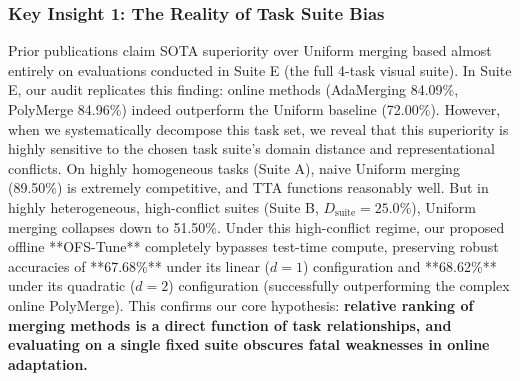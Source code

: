 \subsubsection{Key Insight 1: The Reality of Task Suite Bias}
Prior publications claim SOTA superiority over Uniform merging based almost entirely on evaluations conducted in Suite E (the full 4-task visual suite).
In Suite E, our audit replicates this finding: online methods (AdaMerging 84.09\%, PolyMerge 84.96\%) indeed outperform the Uniform baseline (72.00\%).
However, when we systematically decompose this task set, we reveal that this superiority is highly sensitive to the chosen task suite's domain distance and representational conflicts.
On highly homogeneous tasks (Suite A), naive Uniform merging (89.50\%) is extremely competitive, and TTA functions reasonably well.
But in highly heterogeneous, high-conflict suites (Suite B, $D_{\text{suite}}=25.0\%$), Uniform merging collapses down to 51.50\%.
Under this high-conflict regime, our proposed offline **OFS-Tune** completely bypasses test-time compute, preserving robust accuracies of **67.68\%** under its linear ($d=1$) configuration and **68.62\%** under its quadratic ($d=2$) configuration (successfully outperforming the complex online PolyMerge).
This confirms our core hypothesis: \textbf{relative ranking of merging methods is a direct function of task relationships, and evaluating on a single fixed suite obscures fatal weaknesses in online adaptation.}

